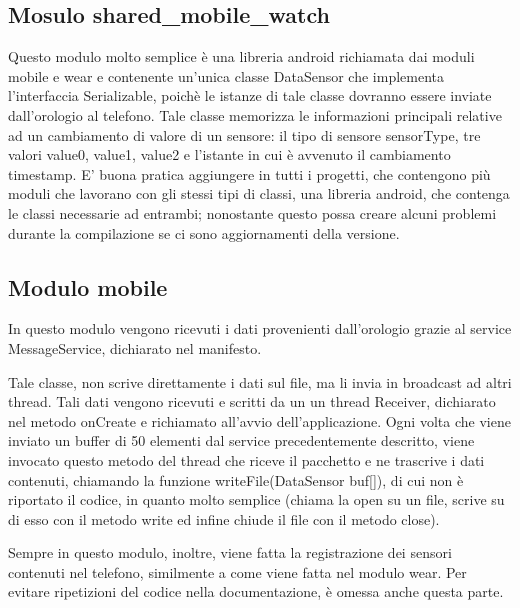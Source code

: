 \documentclass[a4paper, oneside]{book}
\begin{document}
\subsection{Mosulo shared\_mobile\_watch}
Questo modulo molto semplice è una libreria android richiamata dai moduli mobile e wear e contenente un’unica classe DataSensor che implementa l’interfaccia Serializable, poichè le istanze di tale classe dovranno essere inviate dall’orologio al telefono. 
Tale classe memorizza le informazioni principali relative ad un cambiamento di valore di un sensore:  il tipo di sensore sensorType, tre valori value0, value1, value2 e l’istante in cui è avvenuto il cambiamento timestamp.
E’ buona pratica aggiungere in tutti i progetti, che contengono più moduli che lavorano con gli stessi tipi di classi, una libreria android, che contenga le classi necessarie ad entrambi; nonostante questo possa creare alcuni problemi durante la compilazione se ci sono aggiornamenti della versione.
\makebox[\linewidth]{}



\subsection{Modulo mobile}
In questo modulo vengono ricevuti i dati provenienti dall’orologio grazie al service MessageService, dichiarato nel manifesto.\\
\makebox[\linewidth]{}

\makebox[\linewidth]{}
Tale classe, non scrive direttamente i dati sul file, ma li invia in broadcast ad altri thread. Tali dati vengono ricevuti e scritti da un un thread Receiver, dichiarato nel metodo onCreate e richiamato all’avvio dell’applicazione. Ogni volta che viene inviato un buffer di 50 elementi dal service precedentemente descritto, viene invocato questo metodo del thread che riceve il pacchetto e ne trascrive i dati contenuti, chiamando la funzione writeFile(DataSensor buf[]), di cui non è riportato il codice, in quanto molto semplice (chiama la open su un file, scrive su di esso con il metodo write ed infine chiude il file con il metodo close). 

\vspace{2mm}

\vspace{2mm}
Sempre in questo modulo, inoltre, viene fatta la registrazione dei sensori contenuti nel telefono, similmente a come viene fatta nel modulo wear. Per evitare ripetizioni del codice nella documentazione, è omessa anche questa parte.
\end{document}
